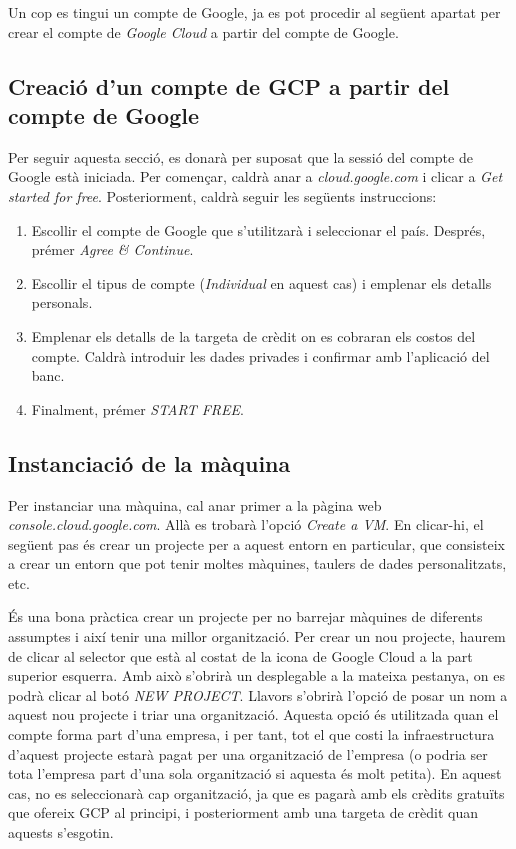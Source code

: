Un cop es tingui un compte de Google, ja es pot procedir al següent apartat per crear el compte de \textit{Google Cloud} a partir del compte de Google.

\subsection{Creació d'un compte de GCP a partir del compte de Google}

Per seguir aquesta secció, es donarà per suposat que la sessió del compte de Google està iniciada. Per començar, caldrà anar a \textit{cloud.google.com} i clicar a \textit{Get started for free}. Posteriorment, caldrà seguir les següents instruccions:

\begin{enumerate} \item Escollir el compte de Google que s'utilitzarà i seleccionar el país. Després, prémer \textit{Agree \& Continue}. \item Escollir el tipus de compte (\textit{Individual} en aquest cas) i emplenar els detalls personals. \item Emplenar els detalls de la targeta de crèdit on es cobraran els costos del compte. Caldrà introduir les dades privades i confirmar amb l'aplicació del banc. \item Finalment, prémer \textit{START FREE}. \end{enumerate}

\subsection{Instanciació de la màquina}

Per instanciar una màquina, cal anar primer a la pàgina web \textit{console.cloud.google.com}. Allà es trobarà l'opció \textit{Create a VM}. En clicar-hi, el següent pas és crear un projecte per a aquest entorn en particular, que consisteix a crear un entorn que pot tenir moltes màquines, taulers de dades personalitzats, etc.

És una bona pràctica crear un projecte per no barrejar màquines de diferents assumptes i així tenir una millor organització. Per crear un nou projecte, haurem de clicar al selector que està al costat de la icona de Google Cloud a la part superior esquerra. Amb això s'obrirà un desplegable a la mateixa pestanya, on es podrà clicar al botó \textit{NEW PROJECT}. Llavors s'obrirà l'opció de posar un nom a aquest nou projecte i triar una organització. Aquesta opció és utilitzada quan el compte forma part d'una empresa, i per tant, tot el que costi la infraestructura d'aquest projecte estarà pagat per una organització de l'empresa (o podria ser tota l'empresa part d'una sola organització si aquesta és molt petita). En aquest cas, no es seleccionarà cap organització, ja que es pagarà amb els crèdits gratuïts que ofereix GCP al principi, i posteriorment amb una targeta de crèdit quan aquests s'esgotin.

